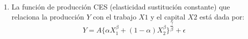 \documentclass[12pt,a4paper]{report}
\begin{document}
\begin{enumerate}
\begin{itemize}
\begin{equation*}
\begin{bmatrix}
y_{11}\\
y_{12}\\
y_{21}\\
y_{23}\\
y_{32}\\
y_{33}\\
\end{bmatrix}
=\begin{bmatrix}
1 & 1 & 0 & 0 & 1 & 0 & 0 \\
1 & 1 & 0 & 0 & 0 & 1 & 0 \\
1 & 0 & 1 & 0 & 1 & 0 & 0 \\
1 & 0 & 1 & 0 & 0 & 0 & 1 \\
1 & 0 & 0 & 1 & 0 & 1 & 0 \\
1 & 0 & 0 & 1 & 0 & 0 & 1 \\
\end{bmatrix}
\begin{bmatrix}
\mu\\
\alpha_{1}\\
\alpha_{2}\\
\alpha_{3}\\
\beta_{1}\\
\beta_{2}\\
\beta_{3}\\
\end{bmatrix}+
\begin{bmatrix}
\epsilon_{11}\\
\epsilon_{12}\\
\epsilon_{21}\\
\epsilon_{23}\\
\epsilon_{32}\\
\epsilon_{33}\\
\end{bmatrix}
\end{equation*}

La matriz diseño tiene una columna de 1 para la media, tres columnas para los tratamientos y tres
columnas para los bloques.

\end{itemize}

\item La función de producción CES (elasticidad sustitución constante) que relaciona la producción $Y$ con el trabajo $X1$ y el capital $X2$ está dada por:\\

$$ Y=A\lbrace \alpha X^{\beta}_{1}+(1-\alpha)X^{\beta}_{2}\rbrace^{\dfrac{\gamma}{\beta}} + \epsilon$$



\end{enumerate}
\end{document}

